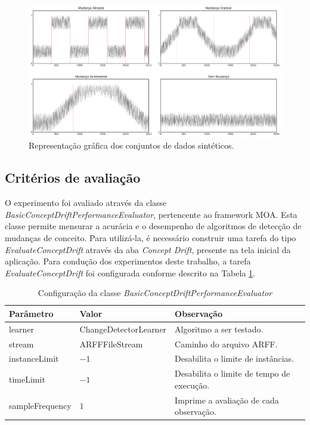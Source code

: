 \documentclass[msc, classic, a4paper]{ufbathesis}
\begin{document}
\begin{figure}[ht]
\begin{center}
    \includegraphics[width=\textwidth]{imagens/conjuntos_dados_sinteticos.png}
    \caption{Representação gráfica dos conjuntos de dados sintéticos.}
    \label{fig:conjuntos_dados_sinteticos}
\end{center}
\end{figure}

\subsection{Critérios de avaliação}

O experimento foi avaliado através da classe \textit{BasicConceptDriftPerformanceEvaluator}, pertencente ao framework MOA.
Esta classe permite mensurar a acurácia e o desempenho de algoritmos de detecção de mudanças de conceito.
Para utilizá-la, é necessário construir uma tarefa do tipo \textit{EvaluateConceptDrift} através da aba \textit{Concept Drift}, presente na tela inicial da aplicação.
Para condução dos experimentos deste trabalho, a tarefa \textit{EvaluateConceptDrift} foi configurada conforme descrito na Tabela \ref{tbl:configuracao_tarefa}.

\newpage

\begin{table}[h]
\centering
\caption{Configuração da classe \textit{BasicConceptDriftPerformanceEvaluator}}
\label{tbl:configuracao_tarefa}
\begin{tabularx}{\textwidth}{ l l X }
\toprule
Parâmetro & Valor & Observação \\
\midrule
learner          & ChangeDetectorLearner  &  Algoritmo a ser testado.               \\
stream           & ARFFFileStream         &  Caminho do arquivo ARFF.  \\
instanceLimit    & $-1$                            &  Desabilita o limite de instâncias.  \\
timeLimit        & $-1$                            &  Desabilita o limite de tempo de execução.  \\
sampleFrequency  & \hspace{2mm}$1$                 &  Imprime a avaliação de cada observação.  \\
\bottomrule
\end{tabularx}
\end{table}
\end{document}
